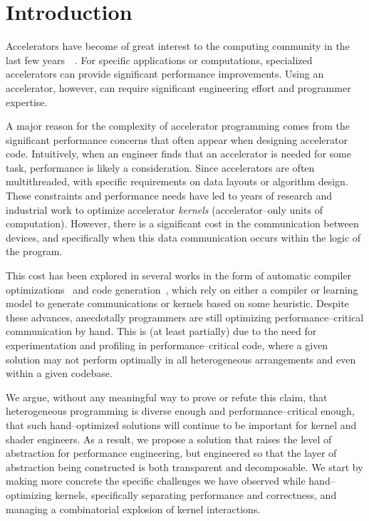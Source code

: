 \section{Introduction}
\label{sec:caimanintro}

Accelerators have become of great interest to the computing community in the last few years~\cite{acceleratorsurvey}~\cite{nnacceleration}.  For specific applications or computations, specialized accelerators can provide significant performance improvements.  Using an accelerator, however, can require significant engineering effort and programmer expertise.

A major reason for the complexity of accelerator programming comes from the significant performance concerns that often appear when designing accelerator code.  Intuitively, when an engineer finds that an accelerator is needed for some task, performance is likely a consideration.  Since accelerators are often multithreaded, with specific requirements on data layouts or algorithm design.  These constraints and performance needs have led to years of research and industrial work to optimize accelerator \emph{kernels} (accelerator--only units of computation).  However, there is a significant cost in the communication between devices, and specifically when this data communication occurs within the logic of the program.

This cost has been explored in several works in the form of automatic compiler optimizations~\cite{gpgpuopti} and code generation~\cite{cudaevolve}, which rely on either a compiler or learning model to generate communications or kernels based on some heuristic.  Despite these advances, anecdotally programmers are still optimizing performance--critical communication by hand.  This is (at least partially) due to the need for experimentation and profiling in performance--critical code, where a given solution may not perform optimally in all heterogeneous arrangements and even within a given codebase.

We argue, without any meaningful way to prove or refute this claim, that heterogeneous programming is diverse enough and performance--critical enough, that such hand--optimized solutions will continue to be important for kernel and shader engineers.  As a result, we propose a solution that raises the level of abstraction for performance engineering, but engineered so that the layer of abstraction being constructed is both transparent and decomposable.  We start by making more concrete the specific challenges we have observed while hand--optimizing kernels, specifically separating performance and correctness, and managing a combinatorial explosion of kernel interactions.

